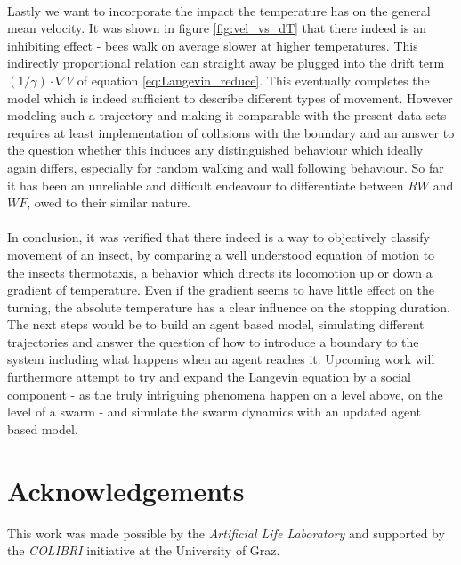 \\
Lastly we want to incorporate the impact the temperature has on the general mean velocity. It was shown in figure \ref{fig:vel_vs_dT} that there indeed is an inhibiting effect - bees walk on average slower at higher temperatures. This indirectly proportional relation can straight away be plugged into the drift term $(1/\gamma) \cdot \nabla V$ of equation \ref{eq:Langevin_reduce}. 
This eventually completes the model which is indeed sufficient to describe different types of movement. However modeling such a trajectory and making it comparable with the present data sets requires at least implementation of collisions with the boundary and an answer to the question whether this induces any distinguished behaviour which ideally again differs, especially for random walking and wall following behaviour.
So far it has been an unreliable and difficult endeavour to differentiate between $RW$ and $WF$, owed to their similar nature.
\\
\\
In conclusion, it was verified that there indeed is a way to objectively classify movement of an insect, by comparing a well understood equation of motion to the insects thermotaxis, a behavior which directs its locomotion up or down a gradient of temperature. Even if the gradient seems to have little effect on the turning, the absolute temperature has a clear influence on the stopping duration.
The next steps would be to build an agent based model, simulating different trajectories and answer the question of how to introduce a boundary to the system including what happens when an agent reaches it.
Upcoming work will furthermore attempt to try and expand the Langevin equation by a social component - as the truly intriguing phenomena happen on a level above, on the level of a swarm - and simulate the swarm dynamics with an updated agent based model.

\section*{Acknowledgements}
This work was made possible by the \emph{Artificial Life Laboratory} and supported by the \emph{COLIBRI} initiative at the University of Graz.



